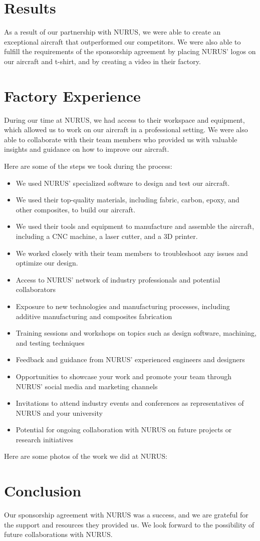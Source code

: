 \documentclass{article}
\begin{document}
\section{Results}

As a result of our partnership with NURUS, we were able to create an exceptional aircraft that outperformed our competitors. We were also able to fulfill the requirements of the sponsorship agreement by placing NURUS' logos on our aircraft and t-shirt, and by creating a video in their factory.

\section{Factory Experience}

During our time at NURUS, we had access to their workspace and equipment, which allowed us to work on our aircraft in a professional setting. We were also able to collaborate with their team members who provided us with valuable insights and guidance on how to improve our aircraft.

Here are some of the steps we took during the process:

\begin{itemize}
    \item We used NURUS' specialized software to design and test our aircraft.
    \item We used their top-quality materials, including fabric, carbon, epoxy, and other composites, to build our aircraft.
    \item We used their tools and equipment to manufacture and assemble the aircraft, including a CNC machine, a laser cutter, and a 3D printer.
    \item We worked closely with their team members to troubleshoot any issues and optimize our design.  
	\item Access to NURUS' network of industry professionals and potential collaborators
	\item Exposure to new technologies and manufacturing processes, including additive manufacturing and composites fabrication
	\item Training sessions and workshops on topics such as design software, machining, and testing techniques
	\item Feedback and guidance from NURUS' experienced engineers and designers
	\item Opportunities to showcase your work and promote your team through NURUS' social media and marketing channels
	\item Invitations to attend industry events and conferences as representatives of NURUS and your university
	\item Potential for ongoing collaboration with NURUS on future projects or research initiatives
\end{itemize}

Here are some photos of the work we did at NURUS:



\section{Conclusion}

Our sponsorship agreement with NURUS was a success, and we are grateful for the support and resources they provided us. We look forward to the possibility of future collaborations with NURUS.
\end{document}
